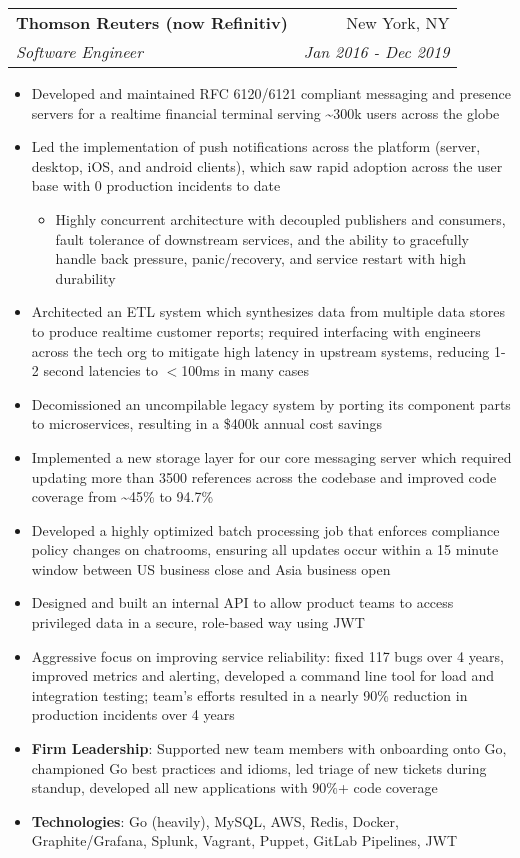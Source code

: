 \documentclass[letterpaper,11pt]{article}
\makeatletter
\newcommand{\resumeItem}[2]{
  \item\small{
    \textbf{#1}{: #2 \vspace{-1.5pt}}
  }
}
\newcommand{\resumeItemSimple}[1]{
  \item\small{
    {#1 \vspace{-1.5pt}}
  }
}
\newcommand{\resumeItemSimpleIndented}[1]{
  \item[--]\small{
    {#1 \vspace{-1.5pt}}
  }
}
\newcommand{\resumeSubheading}[4]{
  \vspace{-1pt}\item
    \begin{tabular*}{0.97\textwidth}[t]{l@{\extracolsep{\fill}}r}
      \textbf{#1} & #2 \\
      \textit{\small#3} & \textit{\small #4} \\
    \end{tabular*}\vspace{-5pt}
}
\newcommand{\resumeItemListStart}{\begin{itemize}}
\newcommand{\resumeItemListEnd}{\end{itemize}\vspace{-5pt}}
\makeatother
\begin{document}
    \resumeSubheading
      {Thomson Reuters (now Refinitiv)}{New York, NY}
      {Software Engineer}{Jan 2016 - Dec 2019}
      \resumeItemListStart
        \resumeItemSimple
          {Developed and maintained RFC 6120/6121 compliant messaging and presence servers for a realtime financial terminal serving \raisebox{-0.7ex}\textasciitilde 300k users across the globe}
        \resumeItemSimple
          {Led the implementation of push notifications across the platform (server, desktop, iOS, and android clients), which saw rapid adoption across the user base with 0 production incidents to date}
        \begin{itemize}[leftmargin=.2in]\resumeItemSimpleIndented
          {Highly concurrent architecture with decoupled publishers and consumers, fault tolerance of downstream services, and the ability to gracefully handle back pressure, panic/recovery, and service restart with high durability}
        \end{itemize}
        \resumeItemSimple
          {Architected an ETL system which synthesizes data from multiple data stores to produce realtime customer reports; required interfacing with engineers across the tech org to mitigate high latency in upstream systems, reducing 1-2 second latencies to $<$100ms in many cases}
        \resumeItemSimple
          {Decomissioned an uncompilable legacy system by porting its component parts to microservices, resulting in a \$400k annual cost savings}
        \resumeItemSimple
          {Implemented a new storage layer for our core messaging server which required updating more than 3500 references across the codebase and improved code coverage from \raisebox{-0.7ex}\textasciitilde 45\% to 94.7\%}
        \resumeItemSimple
          {Developed a highly optimized batch processing job that enforces compliance policy changes on chatrooms, ensuring all updates occur within a 15 minute window between US business close and Asia business open}
        \resumeItemSimple
          {Designed and built an internal API to allow product teams to access privileged data in a secure, role-based way using JWT}
        \resumeItemSimple
          {Aggressive focus on improving service reliability: fixed 117 bugs over 4 years, improved metrics and alerting, developed a command line tool for load and integration testing; team's efforts resulted in a nearly 90\% reduction in production incidents over 4 years}
        \resumeItem{Firm Leadership}
        {Supported new team members with onboarding onto Go, championed Go best practices and idioms, led triage of new tickets during standup, developed all new applications with 90\%+ code coverage}
        \resumeItem{Technologies}
        {Go (heavily), MySQL, AWS, Redis, Docker, Graphite/Grafana, Splunk, Vagrant, Puppet, GitLab Pipelines, JWT}
      \resumeItemListEnd
\end{document}
